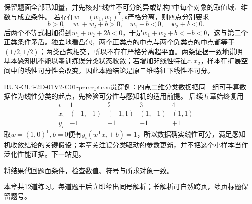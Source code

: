 \label{struct:V2-C01-CH33}
\begin{solution}
\SolGiven 保留题面全部已知量，并先核对“线性不可分的异或结构”中每个对象的取值域、维数与成立条件。
\SolDerive
若存在$w=(w_1,w_2)^{\mathsf T},b$严格分离，则四点分别要求
\[
b>0,\quad w_1+w_2+b>0,\quad w_1+b<0,\quad w_2+b<0.
\]
后两个不等式相加得到$w_1+w_2+2b<0$，于是$w_1+w_2+b<-b<0$，这与第二个正类条件矛盾。独立地看凸包，两个正类点的中点与两个负类点的中点都等于$(1/2,1/2)$；两类凸包相交，所以不存在严格分离超平面。两条证据一致地说明基本感知机不能以零训练误分类状态收敛；若增加非线性特征$x_1x_2$，样本在扩展空间中的线性可分性会改变。因此本题结论是原二维特征下线性不可分。

\begin{SLRunningExample}{RUN-CLS-2D-01}{V2-C01-perceptron}{贯穿例：四点二维分类数据}{把同一组可手算数据作为线性分类的起点，先检验可分性与感知机的适用前提。}
后续五章始终复用
\[
\begin{array}{c|cccc}
i&1&2&3&4\\ \hline
x_i&(-1,-1)&(-1,1)&(1,-1)&(1,1)\\
y_i&-1&-1&+1&+1
\end{array}
\]
取$w=(1,0)^{\mathsf T},b=0$便有$y_i(w^{\mathsf T}x_i+b)=1$，所以数据确实线性可分，满足感知机收敛结论的关键假设；本章关注误分类驱动的参数更新，并不把这个小样本当作泛化性能证据。下一站见。
\end{SLRunningExample}
\SolCheck 将结果代回题面条件，检查数值、符号与所求对象一致。
\end{solution}


\label{struct:V2-C01-CH34}
\begin{chapterexercisebox}
\label{struct:V2-C01-CH35}
本章共12道练习。每道题干后立即给出同号解析；长解析可自然跨页，续页标题保留题号。
\end{chapterexercisebox}

